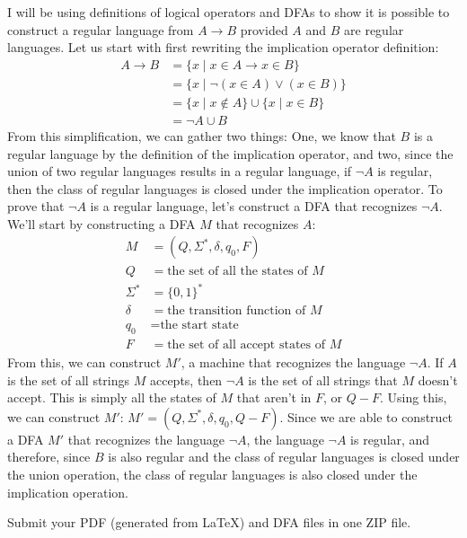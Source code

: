 \documentclass[12pt, letter]{article}
\begin{document}
	\begin{center}
		I will be using definitions of logical operators and DFAs to show it is possible to construct a regular language from $A \rightarrow B$ provided $A$ and $B$ are regular languages. Let us start with first rewriting the implication operator definition:
		\begin{align*}
			A \rightarrow B &= \{x \mid x \in A \rightarrow x \in B\} \\
			&= \{x \mid \neg (x \in A) \vee (x \in B)\} \\
			&= \{x \mid x \not\in A\} \cup \{x \mid x \in B\} \\
			&= \neg A \cup B
		\end{align*}
		From this simplification, we can gather two things: One, we know that $B$ is a regular language by the definition of the implication operator, and two, since the union of two regular languages results in a regular language, if $\neg A$ is regular, then the class of regular languages is closed under the implication operator. To prove that $\neg A$ is a regular language, let's construct a DFA that recognizes $\neg A$. We'll start by constructing a DFA $M$ that recognizes $A$:
		\begin{align*}
			M &= (Q, \Sigma^{*}, \delta, q_{0}, F) \\
			Q &= \text{the set of all the states of } M \\
			\Sigma^{*} &= \{0, 1\}^{*} \\
			\delta &= \text{the transition function of } M \\
			q_{0} &= \text{the start state} \\
			F &= \text{the set of all accept states of } M
		\end{align*}
		From this, we can construct $M'$, a machine that recognizes the language $\neg A$. If $A$ is the set of all strings $M$ accepts, then $\neg A$ is the set of all strings that $M$ doesn't accept. This is simply all the states of $M$ that aren't in $F$, or $Q - F$. Using this, we can construct $M'$: $M' = (Q, \Sigma^{*}, \delta, q_{0}, Q - F)$. Since we are able to construct a DFA $M'$ that recognizes the language $\neg A$, the language $\neg A$ is regular, and therefore, since $B$ is also regular and the class of regular languages is closed under the union operation, the class of regular languages is also closed under the implication operation.
	\end{center}
	\vfill \hfill Submit your PDF (generated from \LaTeX) and DFA files in one ZIP file. 
\end{document}
